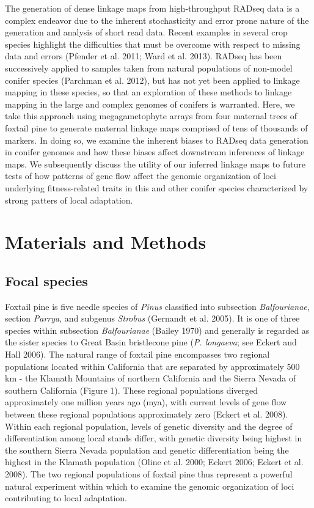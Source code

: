 \documentclass[11pt]{article}
\begin{document}
The generation of dense linkage maps from high-throughput RADseq data is a complex endeavor due to the inherent stochasticity
and error prone nature of the generation and analysis of short read data. Recent examples in several crop species highlight the
difficulties that must be overcome with respect to missing data and errors (Pfender et al. 2011; Ward et al. 2013). RADseq has been 
successively applied to samples taken from natural populations of non-model conifer species (Parchman et al. 2012), but has not yet 
been applied to linkage mapping in these species, so that an exploration of these methods to linkage mapping in the large and complex 
genomes of conifers is warranted. Here, we take this approach using megagametophyte arrays from four maternal trees of foxtail pine
to generate maternal linkage maps comprised of tens of thousands of markers. In doing so, we examine the inherent biases
to RADseq data generation in conifer genomes and how these biases affect downstream inferences of linkage maps. We subsequently discuss
the utility of our inferred linkage maps to future tests of how patterns of gene flow affect the genomic organization 
of loci underlying fitness-related traits in this and other conifer species characterized by strong patters of local adaptation.


\section{Materials and Methods}

\subsection{Focal species}
Foxtail pine is five needle species of \textit{Pinus} classified into 
subsection \textit{Balfourianae}, section \textit{Parrya}, and subgenus \textit{Strobus} 
(Gernandt et al. 2005). It is one of three species within subsection \textit{Balfourianae} 
(Bailey 1970) and generally is regarded as the sister species to Great Basin bristlecone pine (\textit{P. longaeva}; see 
Eckert and Hall 2006). The natural range of foxtail pine encompasses two 
regional populations located within California that are separated by approximately 500 km - 
the Klamath Mountains of northern California and the Sierra Nevada of southern California 
(Figure 1). These regional populations diverged approximately one million years ago (mya), 
with current levels of gene flow between these regional populations approximately zero 
(Eckert et al. 2008). Within each regional population, levels of genetic diversity and the 
degree of differentiation among local stands differ, with genetic diversity being highest in 
the southern Sierra Nevada population and genetic differentiation being the highest in the 
Klamath population (Oline et al. 2000; Eckert 2006; Eckert et al. 2008). The two regional 
populations of foxtail pine thus represent a powerful natural experiment within which to examine
the genomic organization of loci contributing to local adaptation.
\end{document}
